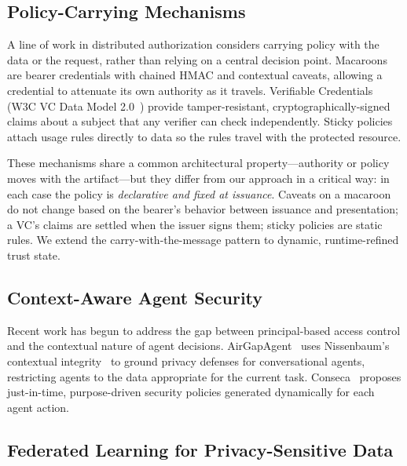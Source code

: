 \documentclass[sigconf,nonacm]{acmart}
\begin{document}
\subsection{Policy-Carrying Mechanisms}

A line of work in distributed authorization considers carrying policy with the data or the request, rather than relying on a central decision point. Macaroons~\cite{REF:macaroons} are bearer credentials with chained HMAC and contextual caveats, allowing a credential to attenuate its own authority as it travels. Verifiable Credentials (W3C VC Data Model 2.0~\cite{REF:vc}) provide tamper-resistant, cryptographically-signed claims about a subject that any verifier can check independently. Sticky policies~\cite{REF:sticky-policies} attach usage rules directly to data so the rules travel with the protected resource.

These mechanisms share a common architectural property---authority or policy moves with the artifact---but they differ from our approach in a critical way: in each case the policy is \emph{declarative and fixed at issuance}. Caveats on a macaroon do not change based on the bearer's behavior between issuance and presentation; a VC's claims are settled when the issuer signs them; sticky policies are static rules. We extend the carry-with-the-message pattern to dynamic, runtime-refined trust state.

\subsection{Context-Aware Agent Security}

Recent work has begun to address the gap between principal-based access control and the contextual nature of agent decisions. AirGapAgent~\cite{REF:airgap} uses Nissenbaum's contextual integrity~\cite{REF:nissenbaum} to ground privacy defenses for conversational agents, restricting agents to the data appropriate for the current task. Conseca~\cite{REF:conseca} proposes just-in-time, purpose-driven security policies generated dynamically for each agent action.


\subsection{Federated Learning for Privacy-Sensitive Data}
\end{document}
